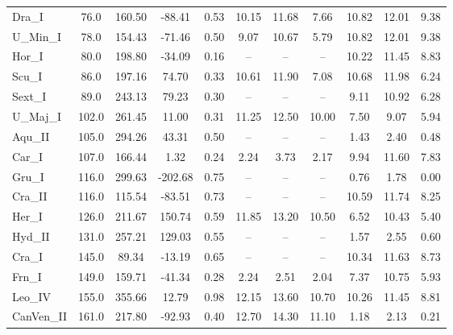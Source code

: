 \begin{table*}
\begin{tabular}{lcccccccccc}
     Dra\_I &      76.0 &  160.50 &  -88.41 &  0.53 &  10.15 &      11.68 &       7.66 &   10.82 &         12.01 &          9.38 \\
   U\_Min\_I &      78.0 &  154.43 &  -71.46 &  0.50 &   9.07 &      10.67 &       5.79 &   10.82 &         12.01 &          9.38 \\
     Hor\_I &      80.0 &  198.80 &  -34.09 &  0.16 &     -- &         -- &         -- &   10.22 &         11.45 &          8.83 \\
     Scu\_I &      86.0 &  197.16 &   74.70 &  0.33 &  10.61 &      11.90 &       7.08 &   10.68 &         11.98 &          6.24 \\
    Sext\_I &      89.0 &  243.13 &   79.23 &  0.30 &     -- &         -- &         -- &    9.11 &         10.92 &          6.28 \\
   U\_Maj\_I &     102.0 &  261.45 &   11.00 &  0.31 &  11.25 &      12.50 &      10.00 &    7.50 &          9.07 &          5.94 \\
    Aqu\_II &     105.0 &  294.26 &   43.31 &  0.50 &     -- &         -- &         -- &    1.43 &          2.40 &          0.48 \\
     Car\_I &     107.0 &  166.44 &    1.32 &  0.24 &   2.24 &       3.73 &       2.17 &    9.94 &         11.60 &          7.83 \\
     Gru\_I &     116.0 &  299.63 & -202.68 &  0.75 &     -- &         -- &         -- &    0.76 &          1.78 &          0.00 \\
    Cra\_II &     116.0 &  115.54 &  -83.51 &  0.73 &     -- &         -- &         -- &   10.59 &         11.74 &          8.25 \\
     Her\_I &     126.0 &  211.67 &  150.74 &  0.59 &  11.85 &      13.20 &      10.50 &    6.52 &         10.43 &          5.40 \\
    Hyd\_II &     131.0 &  257.21 &  129.03 &  0.55 &     -- &         -- &         -- &    1.57 &          2.55 &          0.60 \\
     Cra\_I &     145.0 &   89.34 &  -13.19 &  0.65 &     -- &         -- &         -- &   10.34 &         11.63 &          8.73 \\
     Frn\_I &     149.0 &  159.71 &  -41.34 &  0.28 &   2.24 &       2.51 &       2.04 &    7.37 &         10.75 &          5.93 \\
    Leo\_IV &     155.0 &  355.66 &   12.79 &  0.98 &  12.15 &      13.60 &      10.70 &   10.26 &         11.45 &          8.81 \\
 CanVen\_II &     161.0 &  217.80 &  -92.93 &  0.40 &  12.70 &      14.30 &      11.10 &    1.18 &          2.13 &          0.21 \\

\end{tabular}
\end{table*}
